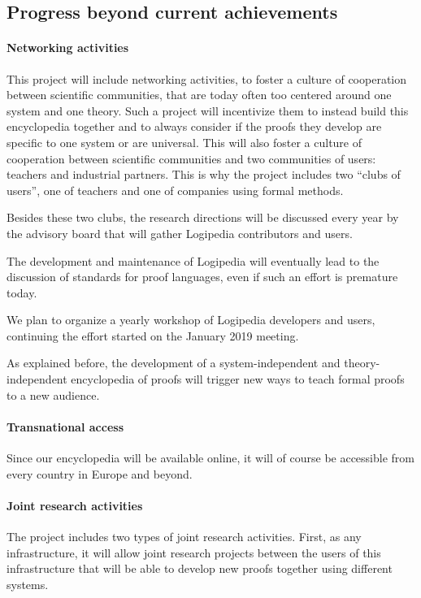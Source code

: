 \subsection{Progress beyond current achievements}


\paragraph{Networking activities}
This project will include networking activities, to foster a culture
of cooperation between scientific communities, that are today often
too centered around one system and one theory. Such a project
will incentivize them to instead build this encyclopedia together and to always
consider if the proofs they develop are specific to one system or are
universal. This will also foster a culture of cooperation between
scientific communities and two communities of users: teachers and
industrial partners. This is why the project includes two ``clubs of
users'', one of teachers and one of companies using formal methods.

Besides these two clubs, the research directions will be discussed every
year by the advisory board that will gather {\sc Logipedia} contributors
and users.

The development and maintenance of {\sc Logipedia} will eventually lead
to the discussion of standards for proof languages, even if such an
effort is premature today.

We plan to organize a yearly workshop of {\sc Logipedia} developers
and users, continuing the effort started on the January 2019 meeting.

As explained before, the development of a system-independent and
theory-independent encyclopedia of proofs will trigger new
ways to teach formal proofs to a new audience.


\paragraph{Transnational access}
Since our encyclopedia will be available online, it will of course be
accessible from every country in Europe and beyond.


\paragraph{Joint research activities}
The project includes two types of joint research activities.  First,
as any infrastructure, it will allow joint research projects
between the users of this infrastructure that will be able to develop
new proofs together using different systems.

